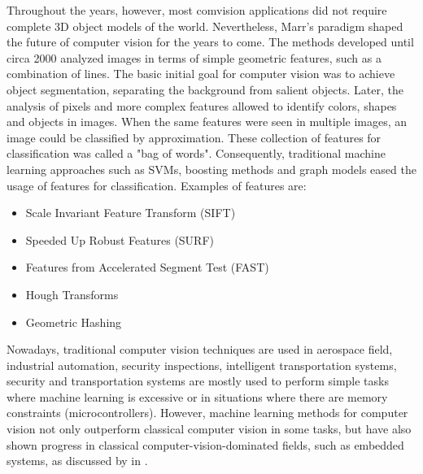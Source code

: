 Throughout the years, however, most com\laeputer vision applications did not require complete 3D object models of the world. Nevertheless, Marr's paradigm shaped the future of computer vision for the years to come. The methods developed until circa 2000 analyzed images in terms of simple geometric features, such as a combination of lines.
The basic initial goal for computer vision was to achieve object segmentation, separating the background from salient objects. Later, the analysis of pixels and more complex features allowed to identify colors, shapes and objects in images. When the same features were seen in multiple images, an image could be classified by approximation. These collection of features for classification was called a "bag of words". Consequently, traditional machine learning approaches such as SVMs, boosting methods and graph models eased the usage of features for classification. Examples of features are:
\begin{itemize}
    \item Scale Invariant Feature Transform (SIFT) \cite{karami2017image}
    \item Speeded Up Robust Features (SURF) \cite{bay2006surf}
    \item Features from Accelerated Segment Test (FAST) \cite{rosten2006machine}
    \item Hough Transforms \cite{goldenshluger2004hough}
    \item Geometric Hashing \cite{tsai1994geometric}

\end{itemize}
Nowadays, traditional computer vision techniques are used in aerospace field, industrial automation, security inspections, intelligent transportation systems, security and transportation systems \citeauthor{bhargava2018fruits} are mostly used to perform simple tasks where machine learning is excessive or in situations where there are memory constraints (microcontrollers). However, machine learning methods for computer vision not only outperform classical computer vision in some tasks, but have also shown progress in classical computer-vision-dominated fields, such as embedded systems, as discussed by \textcite{zhang2019skynet} in . 



